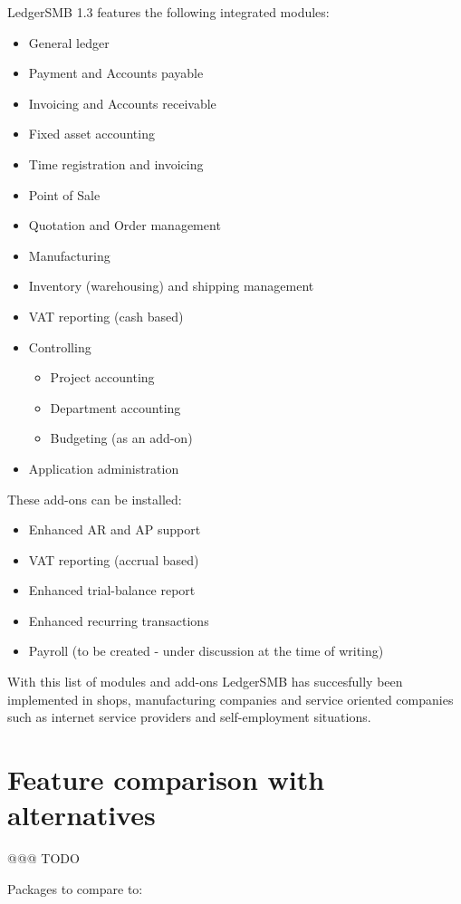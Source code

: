 LedgerSMB 1.3 features the following integrated modules:

\begin{itemize}
\item General ledger
\item Payment and Accounts payable
\item Invoicing and Accounts receivable
\item Fixed asset accounting
\item Time registration and invoicing
\item Point of Sale
\item Quotation and Order management
\item Manufacturing
\item Inventory (warehousing) and shipping management
\item VAT reporting (cash based)
\item Controlling
\begin{itemize}
\item Project accounting
\item Department accounting
\item Budgeting (as an add-on)
\end{itemize}
\item Application administration
\end{itemize}

These add-ons can be installed:
\begin{itemize}
\item Enhanced AR and AP support
\item VAT reporting (accrual based)
\item Enhanced trial-balance report
\item Enhanced recurring transactions
\item Payroll (to be created - under discussion at the time of writing)
\end{itemize}

With this list of modules and add-ons LedgerSMB has succesfully been implemented
in shops, manufacturing companies and service oriented companies such as internet
service providers and self-employment situations.

\section{Feature comparison with alternatives}

@@@ TODO

Packages to compare to:

